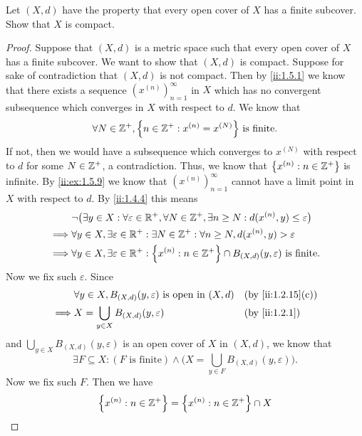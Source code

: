 \begin{ex}\label{ii:ex:1.5.11}
  Let \((X, d)\) have the property that every open cover of \(X\) has a finite subcover.
  Show that \(X\) is compact.
\end{ex}

\begin{proof}
  Suppose that \((X, d)\) is a metric space such that every open cover of \(X\) has a finite subcover.
  We want to show that \((X, d)\) is compact.
  Suppose for sake of contradiction that \((X, d)\) is not compact.
  Then by \cref{ii:1.5.1} we know that there exists a sequence \((x^{(n)})_{n = 1}^\infty\) in \(X\) which has no convergent subsequence which converges in \(X\) with respect to \(d\).
  We know that
  \[
    \forall N \in \Z^+, \set{n \in \Z^+ : x^{(n)} = x^{(N)}} \text{ is finite}.
  \]
  If not, then we would have a subsequence which converges to \(x^{(N)}\) with respect to \(d\) for some \(N \in \mathbb{Z}^+\), a contradiction.
  Thus, we know that \(\left\lbrace x^{(n)} : n \in \mathbb{Z}^+\right\rbrace\) is infinite.
  By \cref{ii:ex:1.5.9} we know that \((x^{(n)})_{n = 1}^\infty\) cannot have a limit point in \(X\) with respect to \(d\).
  By \cref{ii:1.4.4} this means
  \begin{align*}
             & \lnot\big(\exists y \in X : \forall \varepsilon \in \mathbb{R}^+, \forall N \in \mathbb{Z}^+, \exists n \geq N : d(x^{(n)}, y) \leq \varepsilon\big) \\
    \implies & \forall y \in X, \exists \varepsilon \in \mathbb{R}^+ : \exists N \in \mathbb{Z}^+ : \forall n \geq N, d(x^{(n)}, y) > \varepsilon                   \\
    \implies & \forall y \in X, \exists \varepsilon \in \mathbb{R}^+ : \left\lbrace x^{(n)} : n \in \mathbb{Z}^+\right\rbrace \cap B_{(X, d)}(y, \varepsilon) \text{ is finite}.
  \end{align*}
  Now we fix such \(\varepsilon\).
  Since
  \begin{align*}
             & \forall y \in X, B_{(X, d)}(y, \varepsilon) \text{ is open in } (X, d) &  & \by{ii:1.2.15}[c] \\
    \implies & X = \bigcup_{y \in X} B_{(X, d)}(y, \varepsilon)                       &  & \by{ii:1.2.1}
  \end{align*}
  and \(\bigcup_{y \in X} B_{(X, d)}(y, \varepsilon)\) is an open cover of \(X\) in \((X, d)\), we know that
  \[
    \exists F \subseteq X : (F \text{ is finite}) \land \bigg(X = \bigcup_{y \in F} B_{(X, d)}(y, \varepsilon)\bigg).
  \]
  Now we fix such \(F\).
  Then we have
  \begin{align*}
    \set{x^{(n)} : n \in \Z^+} & = \set{x^{(n)} : n \in \Z^+} \cap X                                                        \\

\end{align*}
\end{proof}

